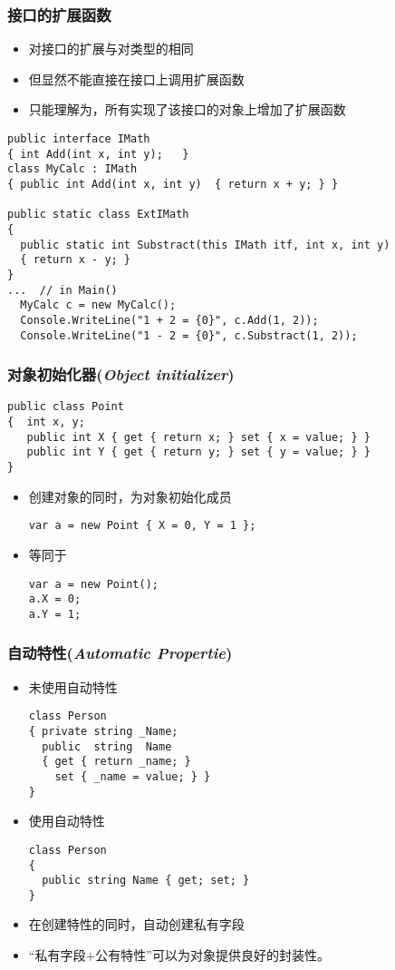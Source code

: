 \begin{frame}[fragile]
\frametitle{接口的扩展函数}
\begin{itemize}
\item 对接口的扩展与对类型的相同
\item 但显然不能直接在接口上调用扩展函数
\item 只能理解为，所有实现了该接口的对象上增加了扩展函数
\end{itemize}
\begin{lstlisting}
public interface IMath
{ int Add(int x, int y);   }
class MyCalc : IMath
{ public int Add(int x, int y)  { return x + y; } }

public static class ExtIMath
{
  public static int Substract(this IMath itf, int x, int y)
  { return x - y; }
}
...  // in Main()
  MyCalc c = new MyCalc();
  Console.WriteLine("1 + 2 = {0}", c.Add(1, 2));
  Console.WriteLine("1 - 2 = {0}", c.Substract(1, 2));
\end{lstlisting}
\end{frame}

\begin{frame}[fragile]
\frametitle{对象初始化器(\textit{Object initializer})}
\begin{lstlisting}
public class Point
{  int x, y;
   public int X { get { return x; } set { x = value; } }
   public int Y { get { return y; } set { y = value; } }
}
\end{lstlisting}
\begin{itemize}
\item 创建对象的同时，为对象初始化成员
\begin{lstlisting}
var a = new Point { X = 0, Y = 1 };
\end{lstlisting}
\item 等同于
\begin{lstlisting}
var a = new Point();
a.X = 0;
a.Y = 1;
\end{lstlisting}
\end{itemize}
\end{frame}

\begin{frame}[fragile]
\frametitle{自动特性(\textit{Automatic Propertie})}
\begin{itemize}
\item 未使用自动特性
\begin{lstlisting}
class Person
{ private string _Name;
  public  string  Name
  { get { return _name; }
    set { _name = value; } }
}
\end{lstlisting}
\item 使用自动特性
\begin{lstlisting}
class Person
{
  public string Name { get; set; }
}
\end{lstlisting}
\item 在创建特性的同时，自动创建私有字段
\item “私有字段$+$公有特性”可以为对象提供良好的封装性。
\end{itemize}
\end{frame}

